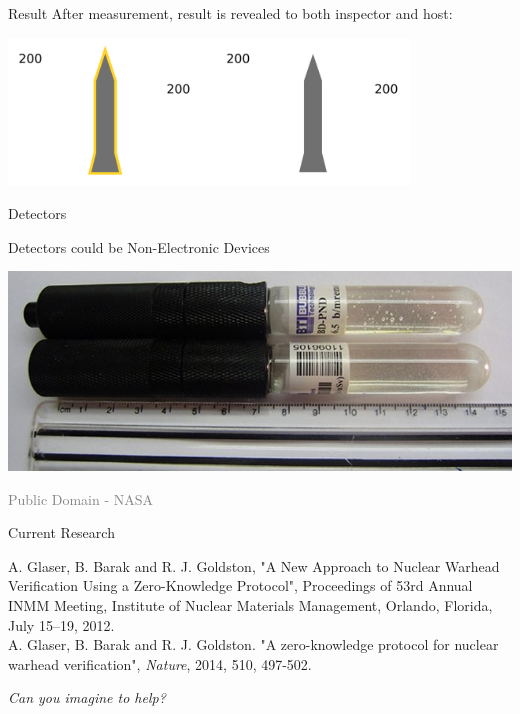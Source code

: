 \documentclass[presentation]{beamer}
\begin{document}
\begin{frame}[label=sec-5-6]{Result}
After measurement, result is revealed to both inspector and host:

\begin{center}
\includegraphics[width=0.8\textwidth]{images/zkp/measurement_step3.pdf}
\end{center}
\end{frame}

\begin{frame}[label=sec-5-7]{Detectors}
\begin{center}
Detectors could be Non-Electronic Devices
\end{center}

\begin{varblock}[\textwidth]{}
\includegraphics[width=\textwidth]{images/zkp/715781main_vial_XL.jpg}
\end{varblock}

\vspace{-0.7cm}
\tiny \textcolor{gray}{Public Domain - NASA}
\end{frame}

\begin{frame}[label=sec-5-8]{Current Research}
\footnotesize 

A. Glaser, B. Barak and R. J. Goldston, "A New Approach to Nuclear Warhead Verification Using a Zero-Knowledge Protocol", Proceedings of 53rd Annual INMM Meeting, Institute of Nuclear Materials Management, Orlando, Florida, July 15–19, 2012.\\[0.3em]

A. Glaser, B. Barak and R. J. Goldston. "A zero-knowledge protocol for nuclear warhead verification",  \emph{Nature}, 2014, 510, 497-502.\\[0.3em]



\pause

\vspace{1cm}

\begin{center}
\emph{Can you imagine to help?}
\end{center}
\end{frame}
\end{document}
